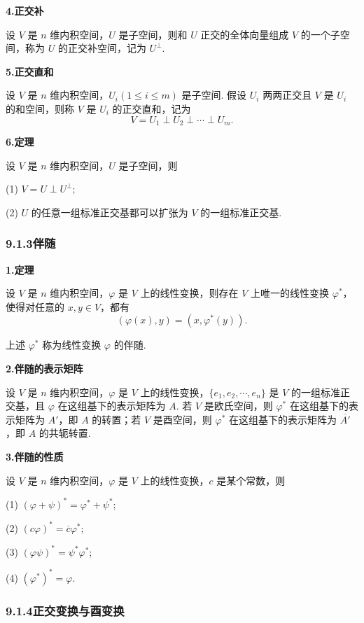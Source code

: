 \documentclass[UTF8,12pt,a4paper,fontset=fandol]{ctexart}
\begin{document}
\noindent\textbf{4.\quad 正交补}

设 $V$ 是 $n$ 维内积空间，$U$ 是子空间，则和 $U$ 正交的全体向量组成 $V$ 的一个子空间，称为 $U$ 的正交补空间，记为 $U^\perp$.

\noindent\textbf{5.\quad 正交直和}

设 $V$ 是 $n$ 维内积空间，$U_i(1\le i\le m)$ 是子空间. 假设 $U_i$ 两两正交且 $V$ 是 $U_i$ 的和空间，则称 $V$ 是 $U_i$ 的正交直和，记为
\[
V=U_1\perp U_2\perp\cdots\perp U_m.
\]

\noindent\textbf{6.\quad 定理}

设 $V$ 是 $n$ 维内积空间，$U$ 是子空间，则

(1) $V=U\perp U^\perp$;

(2) $U$ 的任意一组标准正交基都可以扩张为 $V$ 的一组标准正交基.

\subsubsection*{9.1.3\quad 伴随}

\noindent\textbf{1.\quad 定理}

设 $V$ 是 $n$ 维内积空间，$\varphi$ 是 $V$ 上的线性变换，则存在 $V$ 上唯一的线性变换 $\varphi^*$，使得对任意的 $x,y\in V$，都有
\[
(\varphi(x),y)=(x,\varphi^*(y)).
\]

上述 $\varphi^*$ 称为线性变换 $\varphi$ 的伴随.

\noindent\textbf{2.\quad 伴随的表示矩阵}

设 $V$ 是 $n$ 维内积空间，$\varphi$ 是 $V$ 上的线性变换，$\{e_1,e_2,\cdots,e_n\}$ 是 $V$ 的一组标准正交基，且 $\varphi$ 在这组基下的表示矩阵为 $A$. 若 $V$ 是欧氏空间，则 $\varphi^*$ 在这组基下的表示矩阵为 $A'$，即 $A$ 的转置；若 $V$ 是酉空间，则 $\varphi^*$ 在这组基下的表示矩阵为 $\overline{A'}$，即 $A$ 的共轭转置.

\noindent\textbf{3.\quad 伴随的性质}

设 $V$ 是 $n$ 维内积空间，$\varphi$ 是 $V$ 上的线性变换，$c$ 是某个常数，则

(1) $(\varphi+\psi)^*=\varphi^*+\psi^*$;

(2) $(c\varphi)^*=\overline{c}\varphi^*$;

(3) $(\varphi\psi)^*=\psi^*\varphi^*$;

(4) $(\varphi^*)^*=\varphi$.

\subsubsection*{9.1.4\quad 正交变换与酉变换}
\end{document}
